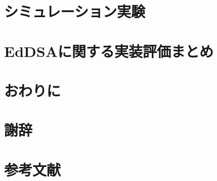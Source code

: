 \documentclass[
  luatex,
  paper=a4paper,
  fontsize=11pt,
  report,
  jlreq_notes,
]{jlreq}
\begin{document}
\chapter[　　 シミュレーション実験]{シミュレーション実験}

\chapter[　　 EdDSAに関する実装評価まとめ]{EdDSAに関する実装評価まとめ}

\chapter*{おわりに}

\chapter*{謝辞}

\chapter*{参考文献}


\end{document}
